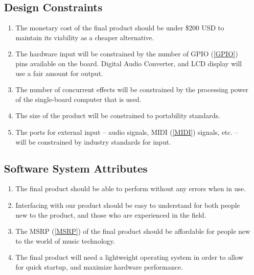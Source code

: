 \subsection{Design Constraints}
    \begin{enumerate}[label=\alph*.]
        \item The monetary cost of the final product should be under \$200 USD to maintain its viability as a cheaper alternative.
        \item The hardware input will be constrained by the number of GPIO (\ref{GPIO}) pins available on the board. Digital Audio Converter, and LCD display will use a fair amount for output.
        \item The number of concurrent effects will be constrained by the processing power of the single-board computer that is used.
        \item The size of the product will be constrained to portability standards.
        \item The ports for external input -- audio signals, MIDI (\ref{MIDI}) signals, etc. -- will be constrained by industry standards for input.
    \end{enumerate}

\subsection{Software System Attributes}
    \begin{enumerate}[label=\alph*.]
        \item The final product should be able to perform without any errors when in use.
        \item Interfacing with our product should be easy to understand for both people new to the product, and those who are experienced in the field.
        \item The MSRP (\ref{MSRP}) of the final product should be affordable for people new to the world of music technology.
        \item The final product will need a lightweight operating system in order to allow for quick startup, and maximize hardware performance.
    \end{enumerate}

